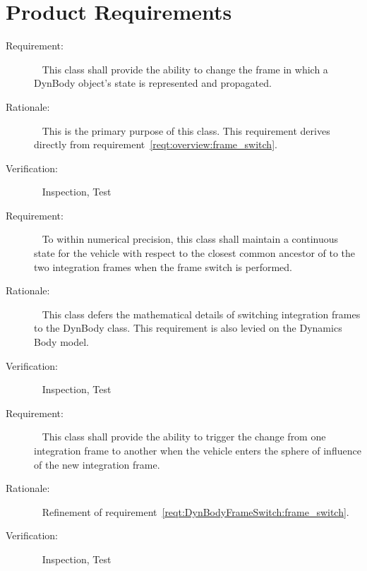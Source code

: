 %

\chapter{Product Requirements}\label{ch:\modelpartid:reqt}


\label{reqt:DynBodyFrameSwitch:frame_switch}
\begin{description}
  \item[Requirement:]\ \newline
    This class shall provide the ability
    to change the frame in which a DynBody object's
    state is represented and propagated.
  \item[Rationale:]\ \newline
    This is the primary purpose of this class.
    This requirement derives directly from
    requirement~\ref{reqt:overview:frame_switch}.
  \item[Verification:]\ \newline
    Inspection, Test
\end{description}

\label{reqt:DynBodyFrameSwitch:frame_switch_continuity}
\begin{description}
  \item[Requirement:]\ \newline
    To within numerical precision,
    this class shall maintain a continuous state
    for the vehicle with respect to the closest common
    ancestor of to the two integration frames
    when the frame switch is performed.
  \item[Rationale:]\ \newline
    This class defers the mathematical details of switching integration
    frames to the DynBody class. This requirement is also levied
    on the Dynamics Body model.
  \item[Verification:]\ \newline
    Inspection, Test
\end{description}

\label{reqt:DynBodyFrameSwitch:frame_switch_on_entry}
\begin{description}
  \item[Requirement:]\ \newline
    This class shall provide the ability
    to trigger the change from one integration frame to another
    when the vehicle
    enters the sphere of influence of the new integration frame.
  \item[Rationale:]\ \newline
    Refinement of requirement~\ref{reqt:DynBodyFrameSwitch:frame_switch}.
  \item[Verification:]\ \newline
    Inspection, Test
\end{description}

